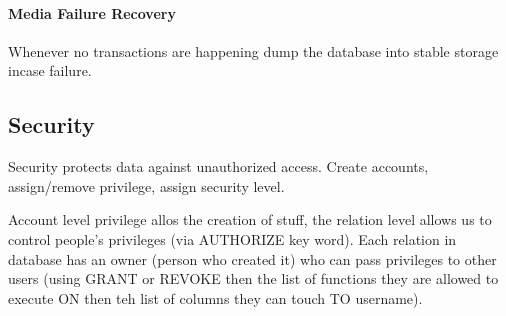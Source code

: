 \documentclass{article}
\begin{document}
\paragraph{Media Failure Recovery} %
\label{par:media_failure_recovery}
Whenever no transactions are happening dump the database into stable storage incase failure.

\subsection{Security} %
\label{sub:security}
Security protects data against unauthorized access. Create accounts, assign/remove privilege, assign security level.

Account level privilege allos the creation of stuff, the relation level allows us to control people's privileges (via AUTHORIZE key word). Each relation in database has an owner (person who created it) who can pass privileges to other users (using GRANT or REVOKE then the list of functions they are allowed to execute ON then teh list of columns they can touch TO username).


\end{document}
